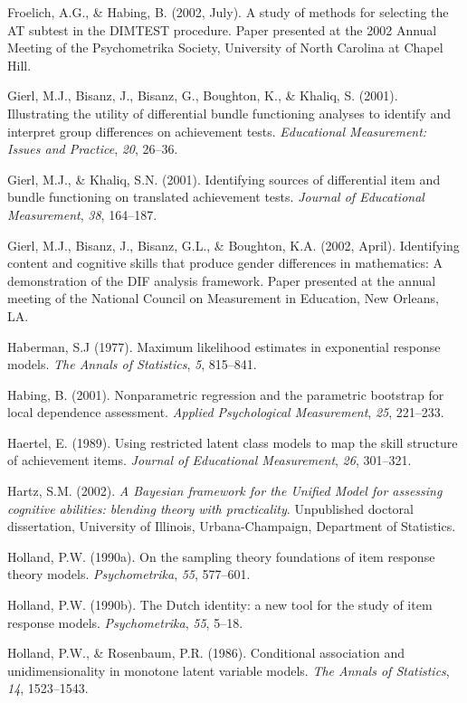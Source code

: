 \documentclass[titlepage,11pt,twoside]{article}
\begin{document}
\begin{thebibliography}
\bibitem Froelich, A.G., \& Habing, B. (2002, July). A study of methods for selecting the AT subtest in the DIMTEST procedure. Paper presented at the 2002 Annual Meeting of the Psychometrika Society, University of North Carolina at Chapel Hill.

\bibitem Gierl, M.J., Bisanz, J., Bisanz, G., Boughton, K., \& Khaliq, S. (2001). Illustrating the utility of differential bundle functioning analyses to identify and interpret group differences on achievement tests. \textit{Educational Measurement: Issues and Practice}, \textit{20}, 26--36.

\bibitem Gierl, M.J., \& Khaliq, S.N. (2001). Identifying sources of differential item and bundle functioning on translated achievement tests. \textit{Journal of Educational Measurement}, \textit{38}, 164--187.

\bibitem Gierl, M.J., Bisanz, J., Bisanz, G.L., \& Boughton, K.A. (2002, April). Identifying content and cognitive skills that produce gender differences in mathematics: A demonstration of the DIF analysis framework. Paper presented at the annual meeting of the National Council on Measurement in Education, New Orleans, LA.

\bibitem Haberman, S.J (1977). Maximum likelihood estimates in exponential response models. \textit{The Annals of Statistics}, \textit{5}, 815--841.

\bibitem Habing, B. (2001). Nonparametric regression and the parametric bootstrap for local dependence assessment. \textit{Applied Psychological Measurement}, \textit{25}, 221--233.

\bibitem Haertel, E. (1989). Using restricted latent class models to map the skill structure of achievement items. \textit{Journal of Educational Measurement}, \textit{26}, 301--321.

\bibitem Hartz, S.M. (2002). \textit{A Bayesian framework for the Unified Model for assessing cognitive abilities: blending theory with practicality}. Unpublished doctoral dissertation, University of Illinois, Urbana-Champaign, Department of Statistics.

\bibitem Holland, P.W. (1990a). On the sampling theory foundations of item response theory models. \textit{Psychometrika}, \textit{55}, 577--601.

\bibitem Holland, P.W. (1990b). The Dutch identity: a new tool for the study of item response models. \textit{Psychometrika}, \textit{55}, 5--18.

\bibitem Holland, P.W., \& Rosenbaum, P.R. (1986). Conditional association and unidimensionality in monotone latent variable models. \textit{The Annals of Statistics}, \textit{14}, 1523--1543.


\end{thebibliography}
\end{document}
